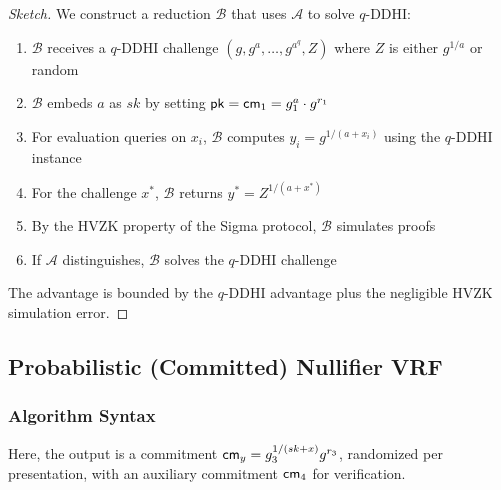 \begin{proof}[Sketch]
We construct a reduction $\mathcal{B}$ that uses $\mathcal{A}$ to solve $q$-DDHI:
\begin{enumerate}
    \item $\mathcal{B}$ receives a $q$-DDHI challenge $(g, g^a, \ldots, g^{a^q}, Z)$ where $Z$ is either $g^{1/a}$ or random
    \item $\mathcal{B}$ embeds $a$ as $sk$ by setting $\mathsf{pk} = \mathsf{cm}_1 = g_1^a \cdot g^{r_1}$
    \item For evaluation queries on $x_i$, $\mathcal{B}$ computes $y_i = g^{1/(a+x_i)}$ using the $q$-DDHI instance
    \item For the challenge $x^*$, $\mathcal{B}$ returns $y^* = Z^{1/(a+x^*)}$
    \item By the HVZK property of the Sigma protocol, $\mathcal{B}$ simulates proofs
    \item If $\mathcal{A}$ distinguishes, $\mathcal{B}$ solves the $q$-DDHI challenge
\end{enumerate}
The advantage is bounded by the $q$-DDHI advantage plus the negligible HVZK simulation error.
\end{proof}


























\subsection{Probabilistic (Committed) Nullifier VRF}\label{sec-probabilistic-nullifier}

\subsubsection{Algorithm Syntax}
Here, the output is a commitment $\mathsf{cm}_y = g_3^{1/(sk + x)} g^{r_3}$, randomized per presentation, with an auxiliary commitment $\mathsf{cm}_4$ for verification.

